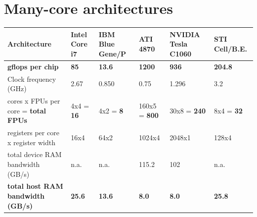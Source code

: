 \documentclass{article}
\begin{document}
\section{Many-core architectures}

\begin{table}[t]
\begin{center}
{\small
\begin{tabular}{|l|l|l|l|l|l|}                                                   
\hline
Architecture                                 & Intel Core i7 & IBM Blue Gene/P& ATI 4870 &  NVIDIA Tesla C1060 & STI Cell/B.E. \\
\hline
\textbf{gflops per chip}                     & \textbf{85}   & \textbf{13.6}  & \textbf{1200}  & \textbf{936}  & \textbf{204.8}\\
Clock frequency (GHz)                        & 2.67          & 0.850          & 0.75           & 1.296         & 3.2           \\
cores x FPUs per core = \textbf{total FPUs}  & 4x4 = \textbf{16} & 4x2 = \textbf{8} & 160x5 = \textbf{800} & 30x8 = \textbf{240} & 8x4 = \textbf{32} \\
registers per core x register width          & 16x4          & 64x2           & 1024x4        & 2048x1         & 128x4         \\
total device RAM bandwidth (GB/s)            & n.a.          & n.a.           & 115.2         & 102            & n.a.          \\
\textbf{total host RAM bandwidth (GB/s)}     & \textbf{25.6} & \textbf{13.6}  & \textbf{8.0}  & \textbf{8.0}   & \textbf{25.8} \\

\end{tabular}}
\end{center}
\end{table}
\end{document}
